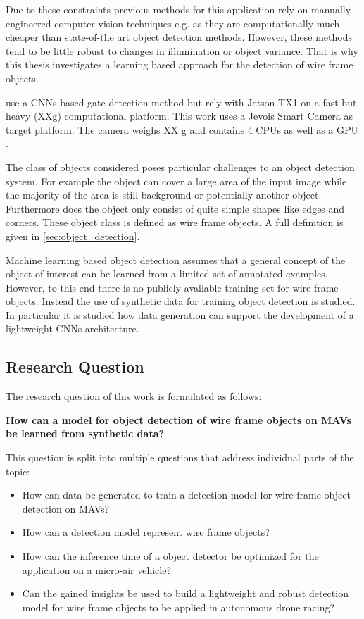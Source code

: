 Due to these constraints previous methods for this application rely on manually engineered computer vision techniques e.g. as they are computationally much cheaper than state-of-the art object detection methods. However, these methods tend to be little robust to changes in illumination or object variance. That is why this thesis investigates a learning based approach for the detection of wire frame objects.

 use a \acp{CNN}-based gate detection method but rely with Jetson TX1 on a fast but heavy (XXg) computational platform. This work uses a Jevois Smart Camera  as target platform. The camera weighs XX g and contains 4 CPUs as well as a GPU .

The class of objects considered poses particular challenges to an object detection system. For example the object can cover a large area of the input image while the majority of the area is still background or potentially another object. Furthermore does the object only consist of quite simple shapes like edges and corners. These object class is defined as wire frame objects. A full definition is given in \autoref{sec:object_detection}.

Machine learning based object detection assumes that a general concept of the object of interest can be learned from a limited set of annotated examples. However,  to this end there is no publicly available training set for wire frame objects. Instead the use of synthetic data for training object detection is studied. In particular it is studied how data generation can support the development of a lightweight \acp{CNN}-architecture.

\subsection*{Research Question}

The research question of this work is formulated as follows:
\begin{center}
	\textbf{How can a model for object detection of wire frame objects on \acp{MAV} be learned from synthetic data?}
\end{center}


This question is split into multiple questions that address individual parts of the topic:

\begin{itemize}
	\item How can data be generated to train a detection model for wire frame object detection on \acp{MAV}?
	\item How can a detection model represent wire frame objects?
	\item How can the inference time of a object detector be optimized for the application on a micro-air vehicle?
	\item Can the gained insights be used to build a lightweight and robust detection model for wire frame objects to be applied in autonomous drone racing?
\end{itemize}

